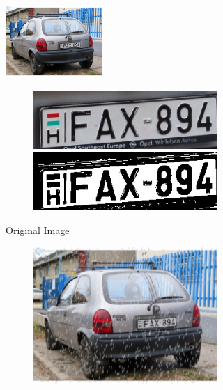 \begin{figure}
    \begin{subfigure}[b]{\textwidth}
        \centering
        \includegraphics[width=0.4\textwidth]{figures/original.jpg}
        \begin{subfigure}[b]{0.4\textwidth}
            \includegraphics[width=\textwidth]{figures/weather-results/cutouts/original_0.jpg}
            \includegraphics[width=\textwidth]{figures/weather-results/cleared/original_0.jpg}
        \end{subfigure}
        \caption{Original Image}
        \label{fig:weather-original}
    \end{subfigure}
    \begin{subfigure}[t]{\textwidth}
        \centering
        \begin{subfigure}[t]{.4\textwidth}
            \centering
            \includegraphics[width=\textwidth]{figures/lightrain.jpg}

\end{subfigure}
\end{subfigure}
\end{figure}
